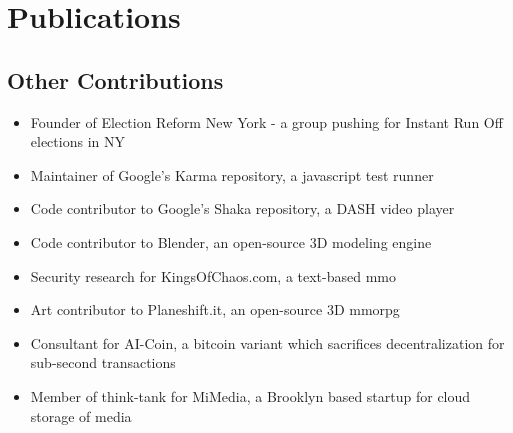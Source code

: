 \documentclass[oneside, final]{scrartcl}
\begin{document}
\begin{center}
\section{Publications}
\begin{flushleft}


\section{Other Contributions}
\begin{itemize}
   \begin{comment}
        \item CIO of Beach Recovery Foundation, non-profit working to reverse human effect on beach erosion
        \item CTO of Simplify Reality, distills current events into 400 word summaries for millennials
    \end{comment}
    \item Founder of Election Reform New York - a group pushing for Instant Run Off elections in NY
    \item Maintainer of Google's Karma repository, a javascript test runner
    \item Code contributor to Google's Shaka repository, a DASH video player
    \item Code contributor to Blender, an open-source 3D modeling engine
    \item Security research for KingsOfChaos.com, a text-based mmo
    \item Art contributor to Planeshift.it, an open-source 3D mmorpg
    \item Consultant for AI-Coin, a bitcoin variant which sacrifices decentralization for sub-second transactions
    \item Member of think-tank for MiMedia, a Brooklyn based startup for cloud storage of media
\end{itemize}




\end{flushleft}
\end{center}
\end{document}
